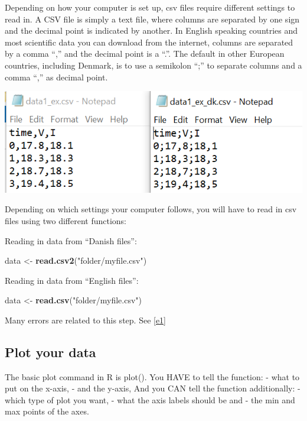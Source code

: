 \documentclass[
]{book}
\newenvironment{Shaded}{\begin{snugshade}}{\end{snugshade}}
\newcommand{\FunctionTok}[1]{\textcolor[rgb]{0.13,0.29,0.53}{\textbf{#1}}}
\newcommand{\NormalTok}[1]{#1}
\newcommand{\OtherTok}[1]{\textcolor[rgb]{0.56,0.35,0.01}{#1}}
\newcommand{\StringTok}[1]{\textcolor[rgb]{0.31,0.60,0.02}{#1}}
\begin{document}
Depending on how your computer is set up, csv files require different settings to read in.
A CSV file is simply a text file, where columns are separated by one sign and the decimal point is indicated by another. In English speaking countries and most scientific data you can download from the internet, columns are separated by a comma ``,'' and the decimal point is a ``.''. The default in other European countries, including Denmark, is to use a semikolon ``;'' to separate columns and a comma ``,'' as decimal point.

\includegraphics[width=8.49in]{images/CSV comparison}

Depending on which settings your computer follows, you will have to read in csv files using two different functions:

Reading in data from ``Danish files'':

\begin{Shaded}
\begin{Highlighting}[]
\NormalTok{data }\OtherTok{\textless{}{-}} \FunctionTok{read.csv2}\NormalTok{(}\StringTok{"folder/myfile.csv"}\NormalTok{)}
\end{Highlighting}
\end{Shaded}

Reading in data from ``English files'':

\begin{Shaded}
\begin{Highlighting}[]
\NormalTok{data }\OtherTok{\textless{}{-}} \FunctionTok{read.csv}\NormalTok{(}\StringTok{"folder/myfile.csv"}\NormalTok{)}
\end{Highlighting}
\end{Shaded}

Many errors are related to this step.
See \ref{e1}

\subsection{Plot your data}\label{plotting}

The basic plot command in R is plot().
You HAVE to tell the function:
- what to put on the x-axis,
- and the y-axis,
And you CAN tell the function additionally:
- which type of plot you want,
- what the axis labels should be and
- the min and max points of the axes.
\end{document}
